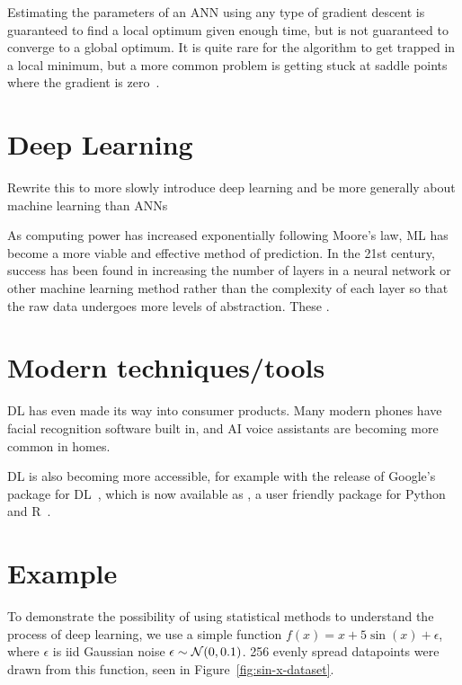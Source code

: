 Estimating the parameters of an \ac{ANN} using any type of gradient descent is guaranteed to find a local optimum given enough time, but is not guaranteed to converge to a global optimum.
It is quite rare for the algorithm to get trapped in a local minimum, but a more common problem is getting stuck at saddle points where the gradient is zero~\autocite[438]{lecun2015}.

\section{Deep Learning} \label{sec:deep-learning}

\begin{todo}
	Rewrite this to more slowly introduce deep learning and be more generally about machine learning than ANNs
\end{todo}

As computing power has increased exponentially following Moore's law, \ac{ML} has become a more viable and effective method of prediction.
In the 21st century, success has been found in increasing the number of layers in a neural network or other machine learning method rather than the complexity of each layer so that the raw data undergoes more levels of abstraction.
These  .

\section{Modern techniques/tools}

\ac{DL} has even made its way into consumer products.
Many modern phones have facial recognition software built in, and \ac{AI} voice assistants are becoming more common in homes.

\ac{DL} is also becoming more accessible, for example with the release of Google's  package for \ac{DL}~\autocite{abadi2016}, which is now available as , a user friendly package for Python~\autocite{chollet2015} and R~\autocite{allaire2018}.

\section{Example}

To demonstrate the possibility of using statistical methods to understand the process of deep learning, we use a simple function \(f(x) = x + 5 \sin(x) + \epsilon\), where \(\epsilon\) is iid Gaussian noise \(\epsilon \sim \mathcal{N}(0, 0.1)\).
256 evenly spread datapoints were drawn from this function, seen in Figure~\ref{fig:sin-x-dataset}.

